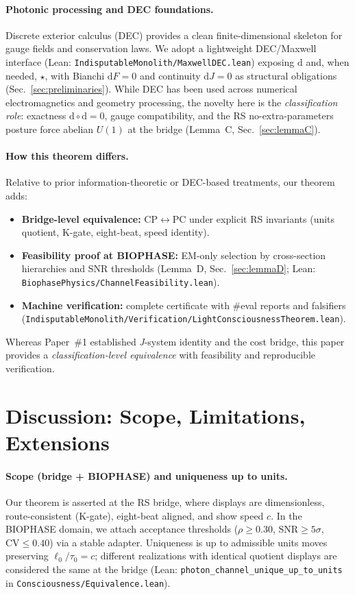 \documentclass[12pt,a4paper]{article}
\begin{document}
\paragraph{Photonic processing and DEC foundations.}
Discrete exterior calculus (DEC) provides a clean finite-dimensional skeleton for gauge fields and conservation laws. We adopt a lightweight DEC/Maxwell interface (Lean: \texttt{IndisputableMonolith/MaxwellDEC.lean}) exposing \(\mathrm{d}\) and, when needed, \(\star\), with Bianchi \(\mathrm{d}F=0\) and continuity \(\mathrm{d}J=0\) as structural obligations (Sec.~\ref{sec:preliminaries}). While DEC has been used across numerical electromagnetics and geometry processing, the novelty here is the \emph{classification role}: exactness \(\mathrm{d}\circ \mathrm{d}=0\), gauge compatibility, and the RS no-extra-parameters posture force abelian \(U(1)\) at the bridge (Lemma~C, Sec.~\ref{sec:lemmaC}).

\paragraph{How this theorem differs.}
Relative to prior information-theoretic or DEC-based treatments, our theorem adds:
\begin{itemize}
  \item \textbf{Bridge-level equivalence:} CP\(\leftrightarrow\)PC under explicit RS invariants (units quotient, K-gate, eight-beat, speed identity).
  \item \textbf{Feasibility proof at BIOPHASE:} EM-only selection by cross-section hierarchies and SNR thresholds (Lemma~D, Sec.~\ref{sec:lemmaD}; Lean: \texttt{BiophasePhysics/ChannelFeasibility.lean}).
  \item \textbf{Machine verification:} complete certificate with \#eval reports and falsifiers (\texttt{IndisputableMonolith/Verification/LightConsciousnessTheorem.lean}).
\end{itemize}
Whereas Paper~\#1 established \emph{J}-system identity and the cost bridge, this paper provides a \emph{classification-level equivalence} with feasibility and reproducible verification.

\section{Discussion: Scope, Limitations, Extensions}
\label{sec:discussion}

\paragraph{Scope (bridge + BIOPHASE) and uniqueness up to units.}
Our theorem is asserted at the RS bridge, where displays are dimensionless, route-consistent (K-gate), eight-beat aligned, and show speed \(c\). In the BIOPHASE domain, we attach acceptance thresholds (\(\rho\ge 0.30\), \(\mathrm{SNR}\ge 5\sigma\), \(\mathrm{CV}\le 0.40\)) via a stable adapter. Uniqueness is up to admissible units moves preserving \(\ell_0/\tau_0=c\); different realizations with identical quotient displays are considered the same at the bridge (Lean: \texttt{photon\_channel\_unique\_up\_to\_units} in \texttt{Consciousness/Equivalence.lean}).
\end{document}
